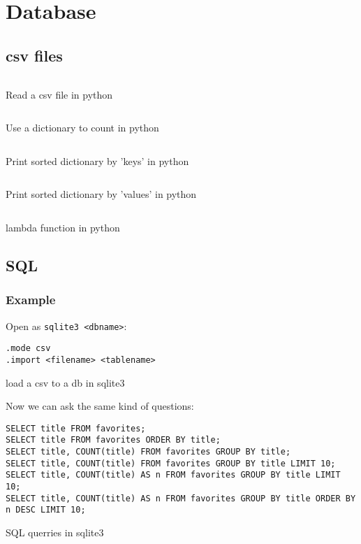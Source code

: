 \chapter{Database}
\section{csv files}
\begin{code}
	\inputminted{python}{codes/src7/favorites0.py}
	\caption{Read a csv file in python}
\end{code}
\clearpage
\begin{code}
	\inputminted{python}{codes/src7/favorites1.py}
	\caption{Use a dictionary to count in python}
\end{code}
\begin{code}
	\inputminted{python}{codes/src7/favorites2.py}
	\caption{Print sorted dictionary by 'keys' in python}
\end{code}
\begin{code}
	\inputminted{python}{codes/src7/favorites3.py}
	\caption{Print sorted dictionary by 'values' in python}
\end{code}
\begin{code}
	\inputminted{python}{codes/src7/favorites4.py}
	\caption{lambda function in python}
\end{code}

\section{SQL}
\subsection{Example}
Open as \texttt{sqlite3 <dbname>}:
\begin{code}
	\begin{verbatim}
.mode csv
.import <filename> <tablename>
	\end{verbatim}
	\caption{load a csv to a db in sqlite3}
\end{code}
Now we can ask the same kind of questions:
\begin{code}
	\begin{verbatim}
SELECT title FROM favorites;
SELECT title FROM favorites ORDER BY title;
SELECT title, COUNT(title) FROM favorites GROUP BY title;
SELECT title, COUNT(title) FROM favorites GROUP BY title LIMIT 10;
SELECT title, COUNT(title) AS n FROM favorites GROUP BY title LIMIT 10;
SELECT title, COUNT(title) AS n FROM favorites GROUP BY title ORDER BY n DESC LIMIT 10;
	\end{verbatim}
	\caption{SQL querries in sqlite3}
\end{code}

